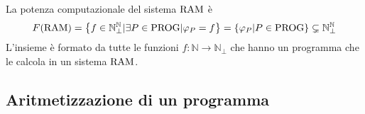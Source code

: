 La potenza computazionale del sistema $\text{RAM}$ è 
$$ F(\text{RAM}) = \left\{f \in \mathbb{N}^{\mathbb{N}}_\bot | \exists P \in \text{PROG} | \varphi_P = f \right\} = \left\{\varphi_P | P \in \text{PROG} \right\} \subsetneq \mathbb{N}^{\mathbb{N}}_\bot $$
L'insieme è formato da tutte le funzioni $f: \mathbb{N} \rightarrow \mathbb{N}_\bot$ che hanno un programma che le calcola in un sistema $\text{RAM}$.\\

\subsection{Aritmetizzazione di un programma}
